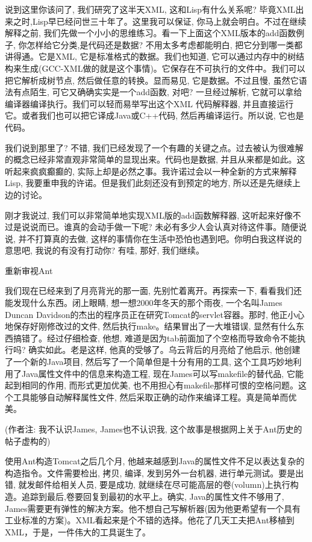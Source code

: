 \documentclass[10pt]{article}
\begin{document}
说到这里你该问了, 我们研究了这半天XML, 这和Lisp有什么关系呢? 毕竟XML出来之时,Lisp早已经问世三十年了。这里我可以保证, 你马上就会明白。不过在继续解释之前, 我们先做一个小小的思维练习。看一下上面这个XML版本的add函数例子, 你怎样给它分类,是代码还是数据? 不用太多考虑都能明白, 把它分到哪一类都讲得通。它是XML, 它是标准格式的数据。我们也知道, 它可以通过内存中的树结构来生成(GCC-XML做的就是这个事情)。它保存在不可执行的文件中。我们可以把它解析成树节点, 然后做任意的转换。显而易见, 它是数据。不过且慢, 虽然它语法有点陌生, 可它又确确实实是一个add函数, 对吧?  一旦经过解析, 它就可以拿给编译器编译执行。我们可以轻而易举写出这个XML 代码解释器, 并且直接运行它。或者我们也可以把它译成Java或C++代码, 然后再编译运行。所以说, 它也是代码。

我们说到那里了? 不错, 我们已经发现了一个有趣的关键之点。过去被认为很难解的概念已经非常直观非常简单的显现出来。代码也是数据, 并且从来都是如此。这听起来疯疯癫癫的, 实际上却是必然之事。我许诺过会以一种全新的方式来解释Lisp, 我要重申我的许诺。但是我们此刻还没有到预定的地方, 所以还是先继续上边的讨论。

刚才我说过, 我们可以非常简单地实现XML版的add函数解释器, 这听起来好像不过是说说而已。谁真的会动手做一下呢? 未必有多少人会认真对待这件事。随便说说, 并不打算真的去做, 这样的事情你在生活中恐怕也遇到吧。你明白我这样说的意思吧, 我说的有没有打动你? 有哇, 那好, 我们继续。

重新审视Ant

我们现在已经来到了月亮背光的那一面, 先别忙着离开。再探索一下, 看看我们还能发现什么东西。闭上眼睛, 想一想2000年冬天的那个雨夜, 一个名叫James Duncan Davidson的杰出的程序员正在研究Tomcat的servlet容器。那时, 他正小心地保存好刚修改过的文件, 然后执行make。结果冒出了一大堆错误, 显然有什么东西搞错了。经过仔细检查, 他想, 难道是因为tab前面加了个空格而导致命令不能执行吗? 确实如此。老是这样, 他真的受够了。乌云背后的月亮给了他启示, 他创建了一个新的Java项目, 然后写了一个简单但是十分有用的工具, 这个工具巧妙地利用了Java属性文件中的信息来构造工程, 现在James可以写makefile的替代品, 它能起到相同的作用, 而形式更加优美, 也不用担心有makefile那样可恨的空格问题。这个工具能够自动解释属性文件, 然后采取正确的动作来编译工程。真是简单而优美。

(作者注: 我不认识James, James也不认识我, 这个故事是根据网上关于Ant历史的帖子虚构的)

使用Ant构造Tomcat之后几个月, 他越来越感到Java的属性文件不足以表达复杂的构造指令。文件需要检出, 拷贝, 编译, 发到另外一台机器, 进行单元测试。要是出错, 就发邮件给相关人员, 要是成功, 就继续在尽可能高层的卷(volumn)上执行构造。追踪到最后,卷要回复到最初的水平上。确实, Java的属性文件不够用了, James需要更有弹性的解决方案。他不想自己写解析器(因为他更希望有一个具有工业标准的方案)。XML看起来是个不错的选择。他花了几天工夫把Ant移植到XML，于是，一件伟大的工具诞生了。
\end{document}
